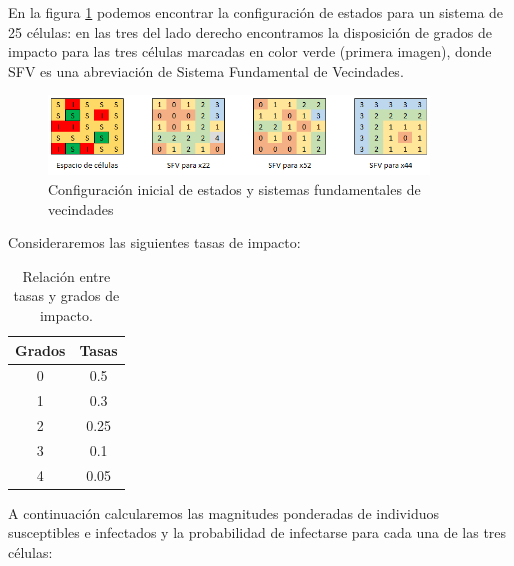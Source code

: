 \begin{example}\label{ex:SIenAutómatasCelulares}
En la figura \ref{fig:configuraciónInicialEspacio25Celulas} podemos encontrar la configuración de estados para un sistema de 25 células: en las tres del lado derecho encontramos la disposición de grados de impacto para las tres células marcadas en color verde (primera imagen), donde SFV es una abreviación de Sistema Fundamental de Vecindades.

\newpage

\begin{figure}[h]\label{fig:configuraciónInicialEspacio25Celulas}
  \centering
    \includegraphics[width=0.9\textwidth]{Imagenes/cellSpace.PNG}
    \caption{Configuración inicial de estados y sistemas fundamentales de vecindades}
\end{figure}

Consideraremos las siguientes tasas de impacto:

\begin{table}[h]
\begin{center}
\begin{tabular}{| c | c |}
\hline
Grados & Tasas \\ \hline
0 & 0.5 \\
1 & 0.3\\
2 & 0.25\\
3 & 0.1\\ 
4 & 0.05\\ \hline
\end{tabular}
\caption{Relación entre tasas y grados de impacto.}
\end{center}
\end{table}

A continuación calcularemos las magnitudes ponderadas de individuos susceptibles e infectados y la probabilidad de infectarse para cada una de las tres células:


\end{example}
